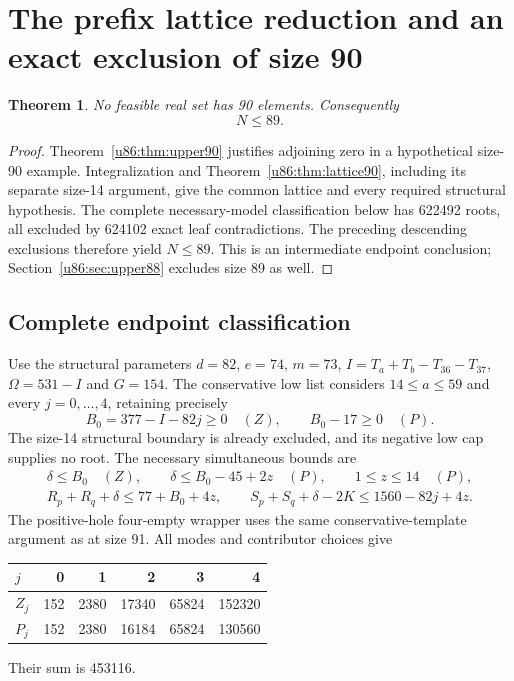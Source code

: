 \documentclass[11pt,a4paper]{article}
\newtheorem{theorem}{Theorem}[section]
\theoremstyle{remark}
\begin{document}
\section{The prefix lattice reduction and an exact exclusion of size 90}\label{u86:sec:upper89}
\begin{theorem}\label{u86:thm:upper89}
No feasible real set has 90 elements. Consequently
\[
 \boxed{N\le89.}
\]
\end{theorem}
\begin{proof}
Theorem~\ref{u86:thm:upper90} justifies adjoining zero in a hypothetical
size-90 example. Integralization and Theorem~\ref{u86:thm:lattice90}, including
its separate size-14 argument, give the common lattice and every required
structural hypothesis. The complete necessary-model classification below
has 622492 roots, all excluded by 624102 exact leaf
contradictions. The preceding descending exclusions therefore yield
$N\le89$. This is an intermediate endpoint conclusion;
Section~\ref{u86:sec:upper88} excludes size 89 as well.
\end{proof}

\subsection{Complete endpoint classification}
Use the structural parameters $d=82$, $e=74$, $m=73$,
$I=T_a+T_b-T_{36}-T_{37}$, $\Omega=531-I$ and $G=154$.
The conservative low list considers $14\le a\le59$ and every
$j=0,\ldots,4$, retaining precisely
\[
 B_0=377-I-82j\ge0\quad(Z),\qquad B_0-17\ge0\quad(P).
\]
The size-14 structural boundary is already excluded, and its negative low
cap supplies no root. The necessary simultaneous bounds are
\begin{gather*}
 \delta\le B_0\quad(Z),\qquad
 \delta\le B_0-45+2z\quad(P),\qquad1\le z\le14\quad(P),\\
 R_p+R_q+\delta\le77+B_0+4z,\qquad
 S_p+S_q+\delta-2K\le1560-82j+4z.
\end{gather*}
The positive-hole four-empty wrapper uses the same conservative-template
argument as at size 91. All modes and contributor choices give
\begin{center}\small
\begin{tabular}{lrrrrr}
\toprule
$j$&0&1&2&3&4\\\midrule
$Z_j$&152&2380&17340&65824&152320\\
$P_j$&152&2380&16184&65824&130560\\\bottomrule
\end{tabular}
\end{center}
Their sum is 453116.
\end{document}
